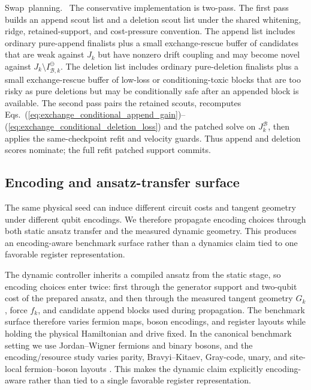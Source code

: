 \documentclass[
  reprint,
  amsmath,
  amssymb,
  aps,
  pra,
  nofootinbib,
  superscriptaddress,
  floatfix
]{revtex4-2}
\newcommand{\placeholder}[1]{\textcolor{red!70!black}{\ifmmode\left[#1\right]\else\textsf{[#1]}\fi}}
\newcommand{\tentative}[1]{\textcolor{red!70!black}{#1}}
\newcommand{\structlabel}[1]{\noindent\mbox{\tentative{#1.}}~}
\begin{document}
\structlabel{Swap planning}
The conservative implementation is two-pass.  The first pass builds an append scout list and a deletion scout list under the shared whitening, ridge, retained-support, and cost-pressure convention.  The append list includes ordinary pure-append finalists plus a small exchange-rescue buffer of candidates that are weak against \(J_k\) but have nonzero drift coupling and may become novel against \(J_k\setminus I_{\mathcal B,k}^{\ominus}\).  The deletion list includes ordinary pure-deletion finalists plus a small exchange-rescue buffer of low-loss or conditioning-toxic blocks that are too risky as pure deletions but may be conditionally safe after an appended block is available.  The second pass pairs the retained scouts, recomputes Eqs.~(\ref{eq:exchange_conditional_append_gain})--(\ref{eq:exchange_conditional_deletion_loss}) and the patched solve on \(J_k^{\mathcal B}\), then applies the same-checkpoint refit and velocity guards.  Thus append and deletion scores nominate; the full refit patched support commits.


\subsection{Encoding and ansatz-transfer surface}
\label{sec:dyn_encoding_surface}

The same physical seed can induce different circuit costs and tangent geometry under different qubit encodings.  We therefore propagate encoding choices through both static ansatz transfer and the measured dynamic geometry.  This produces an encoding-aware benchmark surface rather than a dynamics claim tied to one favorable register representation.

The dynamic controller inherits a compiled ansatz from the static stage, so encoding choices enter twice: first through the generator support and two-qubit cost of the prepared ansatz, and then through the measured tangent geometry $G_k$, force $f_k$, and candidate append blocks used during propagation. The benchmark surface therefore varies fermion maps, boson encodings, and register layouts while holding the physical Hamiltonian and drive fixed. In the canonical benchmark setting we use Jordan--Wigner fermions and binary bosons, and the encoding/resource study varies parity, Bravyi--Kitaev, Gray-code, unary, and site-local fermion--boson layouts \cite{Macridin2018,Macridin2018PRA,Sawaya2020,Li2023}. %
This makes the dynamic claim explicitly encoding-aware rather than tied to a single favorable register representation.
\end{document}
